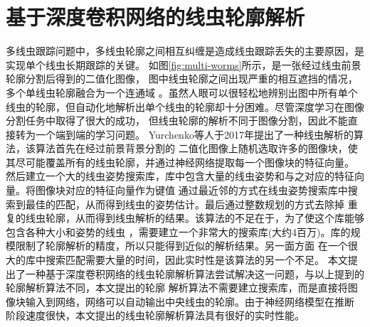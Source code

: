 \section{基于深度卷积网络的线虫轮廓解析}
	多线虫跟踪问题中，多线虫轮廓之间相互纠缠是造成线虫跟踪丢失的主要原因，是实现单个线虫长期跟踪的关键。
	如图\ref{fig:multi-worms}所示，是一张经过线虫前景轮廓分割后得到的二值化图像，
	图中线虫轮廓之间出现严重的相互遮挡的情况，多个单线虫轮廓融合为一个连通域
	。虽然人眼可以很轻松地辨别出图中所有单个线虫的轮廓，但自动化地解析出单个线虫的轮廓却十分困难。尽管深度学习在图像分割任务中取得了很大的成功，
	但线虫轮廓的解析不同于图像分割，因此不能直接转为一个端到端的学习问题。
	Yurchenko等人\cite{yurchenko2017parsing}于2017年提出了一种线虫解析的算法，该算法首先在经过前景背景分割的
	二值化图像上随机选取许多的图像块，使其尽可能覆盖所有的线虫轮廓，并通过神经网络提取每一个图像块的特征向量。
	然后建立一个大的线虫姿势搜索库，库中包含大量的线虫姿势和与之对应的特征向量。将图像块对应的特征向量作为键值
	通过最近邻的方式在线虫姿势搜索库中搜索到最佳的匹配，从而得到线虫的姿势估计。最后通过整数规划的方式去除掉
	重复的线虫轮廓，从而得到线虫解析的结果。该算法的不足在于，为了使这个库能够包含各种大小和姿势的线虫
	，需要建立一个非常大的搜索库(大约4百万)。库的规模限制了轮廓解析的精度，所以只能得到近似的解析结果。另一面方面
	在一个很大的库中搜索匹配需要大量的时间，因此实时性是该算法的另一个不足。
	本文提出了一种基于深度卷积网络的线虫轮廓解析算法尝试解决这一问题，与以上提到的轮廓解析算法不同，本文提出的轮廓
	解析算法不需要建立搜索库，而是直接将图像块输入到网络，网络可以自动输出中央线虫的轮廓。由于神经网络模型在推断
	阶段速度很快，本文提出的线虫轮廓解析算法具有很好的实时性能。
